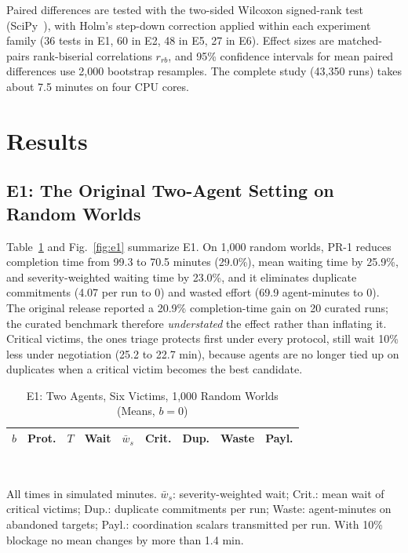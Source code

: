 \documentclass[conference]{IEEEtran}
\newcommand{\PRone}{\textsc{PR-1}}
\begin{document}
Paired differences are tested with the two-sided Wilcoxon signed-rank test (SciPy~\cite{virtanen2020}), with Holm's step-down correction applied within each experiment family (36 tests in E1, 60 in E2, 48 in E5, 27 in E6). Effect sizes are matched-pairs rank-biserial correlations $r_{rb}$, and 95\% confidence intervals for mean paired differences use 2,000 bootstrap resamples. The complete study (43,350 runs) takes about 7.5 minutes on four CPU cores.

\section{Results}
\subsection{E1: The Original Two-Agent Setting on Random Worlds}
Table~\ref{tab:e1} and Fig.~\ref{fig:e1} summarize E1. On 1,000 random worlds, \PRone{} reduces completion time from 99.3 to 70.5 minutes (29.0\%), mean waiting time by 25.9\%, and severity-weighted waiting time by 23.0\%, and it eliminates duplicate commitments (4.07 per run to 0) and wasted effort (69.9 agent-minutes to 0). The original release reported a 20.9\% completion-time gain on 20 curated runs; the curated benchmark therefore \emph{understated} the effect rather than inflating it. Critical victims, the ones triage protects first under every protocol, still wait 10\% less under negotiation (25.2 to 22.7 min), because agents are no longer tied up on duplicates when a critical victim becomes the best candidate.

\begin{table}[!t]
\caption{E1: Two Agents, Six Victims, 1,000 Random Worlds (Means, $b=0$)}
\label{tab:e1}
\centering
\footnotesize
\setlength{\tabcolsep}{2.6pt}
\begin{tabular}{@{}llrrrrrrr@{}}
\toprule
$b$ & Prot. & $T$ & Wait & $\bar w_s$ & Crit. & Dup. & Waste & Payl. \\
\midrule

\end{tabular}\\[2pt]
\parbox{\columnwidth}{\scriptsize All times in simulated minutes. $\bar w_s$: severity-weighted wait; Crit.: mean wait of critical victims; Dup.: duplicate commitments per run; Waste: agent-minutes on abandoned targets; Payl.: coordination scalars transmitted per run. With 10\% blockage no mean changes by more than 1.4 min.}
\end{table}
\end{document}
